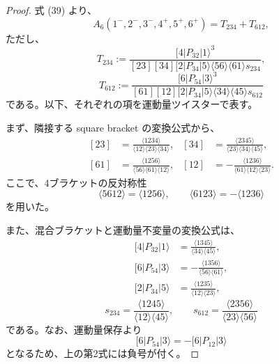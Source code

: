 \documentclass[uplatex,dvipdfmx,a4paper,11pt]{jsarticle}
\renewcommand{\proofname}{Proof}
\newenvironment{myproof}[1][\proofname]
  {\begin{proof}[#1]}
  {\end{proof}}
\numberwithin{equation}{section}
\begin{document}
\begin{myproof}
  式 (39) より、
  \[
    A_6(1^-,2^-,3^-,4^+,5^+,6^+)
      =T_{234}+T_{612},
  \]
  ただし、
  \[
    T_{234}
      :=
      \frac{
        [4|P_{32}|1\rangle^3
      }{
        [23][34][2|P_{34}|5\rangle
        \langle56\rangle\langle61\rangle s_{234}
      },
  \]
  \[
    T_{612}
      :=
      \frac{
        [6|P_{54}|3\rangle^3
      }{
        [61][12][2|P_{34}|5\rangle
        \langle34\rangle\langle45\rangle s_{612}
      }
  \]
  である。以下、それぞれの項を運動量ツイスターで表す。

  まず、隣接する square bracket の変換公式から、
  \[
    \begin{aligned}
      [23]
      &=
      \frac{\langle1234\rangle}{
        \langle12\rangle\langle23\rangle\langle34\rangle
      },
      &
      [34]
      &=
      \frac{\langle2345\rangle}{
        \langle23\rangle\langle34\rangle\langle45\rangle
      },\\
      [61]
      &=
      \frac{\langle1256\rangle}{
        \langle56\rangle\langle61\rangle\langle12\rangle
      },
      &
      [12]
      &=
      -\frac{\langle1236\rangle}{
        \langle61\rangle\langle12\rangle\langle23\rangle
      }.
    \end{aligned}
  \]
  ここで、4ブラケットの反対称性
  \[
    \langle5612\rangle=\langle1256\rangle,
    \qquad
    \langle6123\rangle=-\langle1236\rangle
  \]
  を用いた。

  また、混合ブラケットと運動量不変量の変換公式は、
  \[
    \begin{aligned}
      [4|P_{32}|1\rangle
      &=
      \frac{\langle1345\rangle}{
        \langle34\rangle\langle45\rangle
      },\\
      [6|P_{54}|3\rangle
      &=
      -\frac{\langle1356\rangle}{
        \langle56\rangle\langle61\rangle
      },\\
      [2|P_{34}|5\rangle
      &=
      \frac{\langle1235\rangle}{
        \langle12\rangle\langle23\rangle
      },
    \end{aligned}
  \]
  \[
    s_{234}
      =
      \frac{\langle1245\rangle}{
        \langle12\rangle\langle45\rangle
      },
    \qquad
    s_{612}
      =
      \frac{\langle2356\rangle}{
        \langle23\rangle\langle56\rangle
      }
  \]
  である。なお、運動量保存より
  \[
    [6|P_{54}|3\rangle
      =-[6|P_{12}|3\rangle
  \]
  となるため、上の第2式には負号が付く。


\end{myproof}
\end{document}
